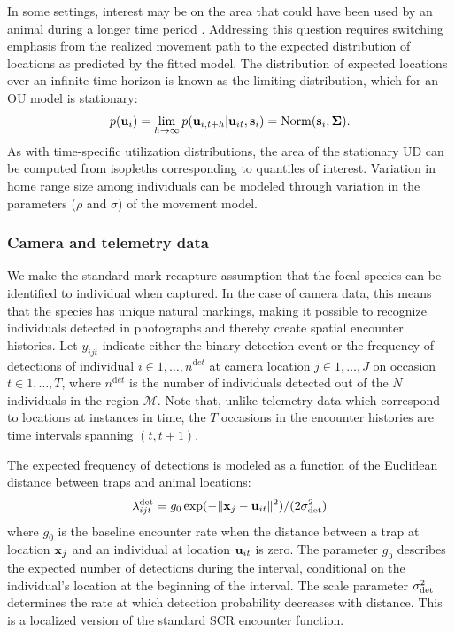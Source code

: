 \documentclass[12pt]{article}
\newcommand{\bsi}{{\bf s}_i}
\newcommand{\bx}{{\bf x}}
\newcommand{\bu}{{\bf u}}
\newcommand{\bui}{{\bf u}_i}
\newcommand{\buit}{{\bf u}_{it}}
\begin{document}
In some settings, interest may be on the area that could have
been used by an animal during a longer time period \citep{fleming_etal:2015}.
Addressing this question requires switching emphasis from the
realized movement path to the expected distribution of locations as
predicted by the fitted model. The distribution of expected locations
over an infinite time horizon is known as the limiting distribution,
which for an OU model is stationary:
\begin{equation}
  p(\bui) = \lim\limits_{h \to \infty} p(\bu_{i,t+h}|\buit,\bsi) = \mathrm{Norm}(\bsi, \bm{\Sigma}).
  \label{eq:ud}
\end{equation}
As with time-specific utilization distributions, the area of the
stationary UD can be computed from isopleths corresponding to
quantiles of interest.
Variation in home range size among individuals can be modeled through
variation in the parameters ($\rho$ and $\sigma$) of the movement model.


\subsubsection{Camera and telemetry data}

We make the standard mark-recapture assumption that the focal species
can be identified to individual when captured. In the case of
camera data, this means that the species has unique natural
markings, making it possible to recognize individuals detected in
photographs and thereby create spatial encounter histories. Let
$y_{ijt}$ indicate either the binary detection event or the frequency
of detections of individual $i\in 1,\dots,n^{\mathrm det}$ at camera
location $j \in 1,\dots,J$ on occasion $t\in 1,\dots,T$, where
$n^{\mathrm det}$ is the number of individuals detected out of
the $N$ individuals in the 
region $\mathcal{M}$. Note that, unlike telemetry data which
correspond to locations at instances in time, the $T$ occasions in
the encounter histories are time {intervals} spanning $(t,t+1)$.

The expected frequency of detections is modeled as a function of
the Euclidean distance between traps and animal locations:
\begin{equation}
  \lambda^{\rm det}_{ijt} = g_0\exp(-\|\bx_{j}-\buit\|^2)/(2\sigma_{\rm det}^2)
  \label{eq:p}
\end{equation}
where $g_0$ is the baseline encounter rate when the distance between
a trap at location $\bx_j$ and an individual at location
$\buit$ is zero. The parameter $g_0$ describes the expected number of 
detections during the interval, conditional on the individual's
location at the beginning of the interval.
The scale parameter $\sigma_{\rm det}^2$ determines
the rate at which detection probability decreases with distance. This is a
localized version of the standard SCR encounter function.
\end{document}
